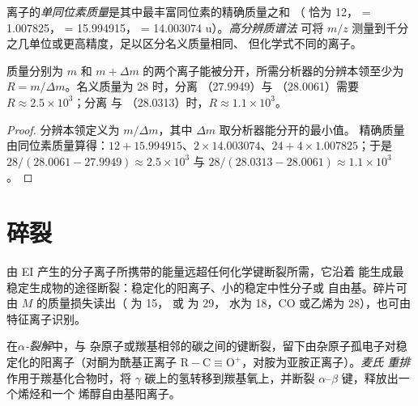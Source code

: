 \begin{definition}[精确质量]\label{def:b2:mass-spec-atomic:exact-mass}
离子的\emph{单同位素质量}是其中最丰富同位素的精确质量之和
（ 恰为 12， = 1.007825， = 15.994915，
 = 14.003074 u）。\emph{高分辨质谱法}
可将 $m/z$ 测量到千分之几单位或更高精度，足以区分名义质量相同、
但化学式不同的离子。
\end{definition}

\begin{proposition}[分辨本领]\label{prop:b2:mass-spec-atomic:resolving}
质量分别为 $m$ 和 $m + \Delta m$ 的两个离子能被分开，所需分析器的分辨本领至少为
$R = m/\Delta m$。名义质量为 28 时，分离 （27.9949）与 （28.0061）需要 $R
\approx 2.5 \times 10^3$；分离  与 （28.0313）时，$R \approx 1.1 \times 10^3$。
\end{proposition}

\begin{proof}
分辨本领定义为 $m/\Delta m$，其中 $\Delta m$ 取分析器能分开的最小值。
精确质量由同位素质量算得：$12 + 15.994915$、$2 \times 14.003074$、$24 + 4 \times
1.007825$；于是 $28/(28.0061 - 27.9949) \approx 2.5 \times 10^3$ 与 $28/(28.0313 - 28.0061) \approx
1.1 \times 10^3$。
\end{proof}

\section{碎裂}

由 EI 产生的分子离子所携带的能量远超任何化学键断裂所需，它沿着
能生成最稳定生成物的途径断裂：稳定化的阳离子、小的稳定中性分子或
自由基。碎片可由 $M$ 的质量损失读出（ 为 15， 或  为 29，
水为 18，CO 或乙烯为 28），也可由特征离子识别。

\begin{definition}[两种碎裂]\label{def:b2:mass-spec-atomic:fragmentation}
在\emph{$\alpha$-裂解}中，与
杂原子或羰基相邻的碳之间的键断裂，留下由杂原子孤电子对稳定化的阳离子（对酮为酰基正离子
$\mathrm{R{-}C{\equiv}O^+}$，对胺为亚胺正离子）。\emph{麦氏
重排}作用于羰基化合物时，将
$\gamma$ 碳上的氢转移到羰基氧上，并断裂 $\alpha$--$\beta$ 键，释放出一个烯烃和一个
烯醇自由基阳离子。
\end{definition}

